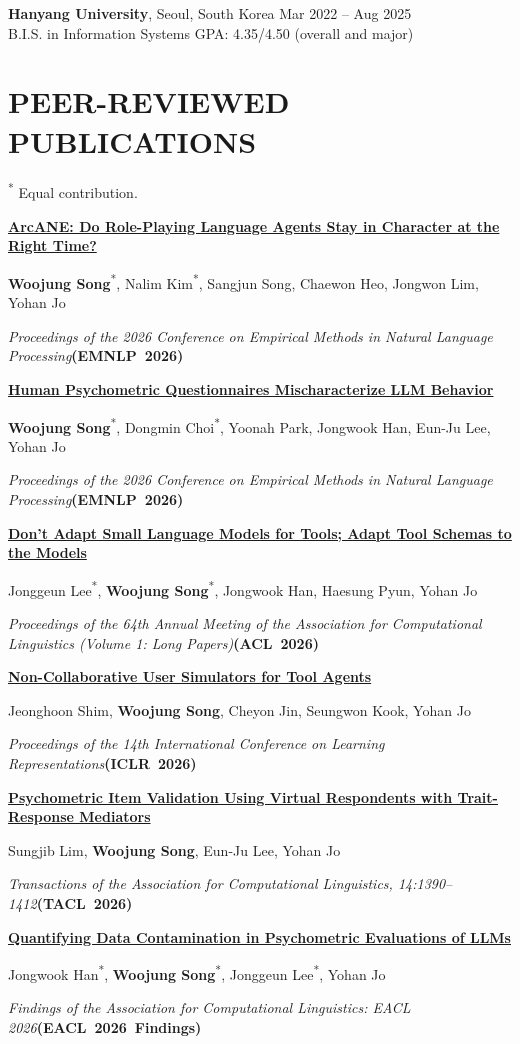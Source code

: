\documentclass[a4paper,10pt]{extarticle}
\newcommand{\publication}[5]{%
    \par\addvspace{8pt}\noindent
    \begin{minipage}{\linewidth}
        \raggedright
        \textbf{\href{#2}{#1}}\par
        #5\par
        \textit{#3}\enspace\mbox{\textbf{(#4)}}\par
    \end{minipage}\par
}
\begin{document}
\medskip
\noindent
\textbf{Hanyang University}, Seoul, South Korea \hfill Mar 2022 -- Aug 2025\\
B.I.S. in Information Systems \hfill GPA: 4.35/4.50 (overall and major)

\section*{PEER-REVIEWED PUBLICATIONS}
{\footnotesize \textsuperscript{*} Equal contribution.}

\publication
{ArcANE: Do Role-Playing Language Agents Stay in Character at the Right Time?}
{https://aclanthology.org/2026.emnlp-main.1998/}
{Proceedings of the 2026 Conference on Empirical Methods in Natural Language Processing}
{EMNLP~2026}
{\textbf{Woojung Song}\textsuperscript{*}, Nalim Kim\textsuperscript{*}, Sangjun Song, Chaewon Heo, Jongwon Lim, Yohan Jo}

\publication
{Human Psychometric Questionnaires Mischaracterize LLM Behavior}
{https://aclanthology.org/2026.emnlp-main.1993/}
{Proceedings of the 2026 Conference on Empirical Methods in Natural Language Processing}
{EMNLP~2026}
{\textbf{Woojung Song}\textsuperscript{*}, Dongmin Choi\textsuperscript{*}, Yoonah Park, Jongwook Han, Eun-Ju Lee, Yohan Jo}

\publication
{Don't Adapt Small Language Models for Tools; Adapt Tool Schemas to the Models}
{https://aclanthology.org/2026.acl-long.948/}
{Proceedings of the 64th Annual Meeting of the Association for Computational Linguistics (Volume 1: Long Papers)}
{ACL~2026}
{Jonggeun Lee\textsuperscript{*}, \textbf{Woojung Song}\textsuperscript{*}, Jongwook Han, Haesung Pyun, Yohan Jo}

\publication
{Non-Collaborative User Simulators for Tool Agents}
{https://openreview.net/forum?id=UAUimofy3W}
{Proceedings of the 14th International Conference on Learning Representations}
{ICLR~2026}
{Jeonghoon Shim, \textbf{Woojung Song}, Cheyon Jin, Seungwon Kook, Yohan Jo}

\publication
{Psychometric Item Validation Using Virtual Respondents with Trait-Response Mediators}
{https://aclanthology.org/2026.tacl-1.63/}
{Transactions of the Association for Computational Linguistics, 14:1390--1412}
{TACL~2026}
{Sungjib Lim, \textbf{Woojung Song}, Eun-Ju Lee, Yohan Jo}

\publication
{Quantifying Data Contamination in Psychometric Evaluations of LLMs}
{https://aclanthology.org/2026.findings-eacl.319/}
{Findings of the Association for Computational Linguistics: EACL 2026}
{EACL~2026~Findings}
{Jongwook Han\textsuperscript{*}, \textbf{Woojung Song}\textsuperscript{*}, Jonggeun Lee\textsuperscript{*}, Yohan Jo}
\end{document}
